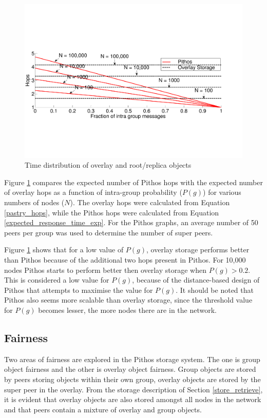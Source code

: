\documentclass[10pt,a4paper,conference]{IEEEtran}
\begin{document}
\begin{figure}[htbp]
 \centering
 \includegraphics[clip=true, viewport=0cm 5cm 27cm 14.5cm, width=\columnwidth]{Hops_vsGroupFrac_4n}
 \caption{Time distribution of overlay and root/replica objects}
 \label{fig_hop_compare}
\end{figure}
%
Figure \ref{fig_hop_compare} compares the expected number of Pithos hops with the expected number of overlay hops as a function of intra-group
probability ($P(g)$) for various numbers of nodes ($N$). The overlay hops were calculated from Equation \eqref{pastry_hops}, while the Pithos hops
were calculated from Equation \eqref{expected_response_time_exp}. For the Pithos graphs, an average number of 50 peers per group was used to
determine the number of super peers.

Figure \ref{fig_hop_compare} shows that for a low value of $P(g)$, overlay storage performs better than Pithos because of the additional two hops
present in Pithos. For 10,000 nodes Pithos starts to perform better then overlay storage when $P(g) > 0.2$. This is considered a low value for
$P(g)$, because of the distance-based design of Pithos that attempts to maximise the value for $P(g)$. It should be noted that Pithos also seems more
scalable than overlay storage, since the threshold value for $P(g)$ becomes lesser, the more nodes there are in the network.

\subsection{Fairness}

Two areas of fairness are explored in the Pithos storage system. The one is group object fairness and the other is overlay object fairness. Group
objects are stored by peers storing objects within their own group, overlay objects are stored by the super peer in the overlay. From the storage
description of Section \ref{store_retrieve}, it is evident that overlay objects are also stored amongst all nodes in the network and that peers
contain a mixture of overlay and group objects.
\end{document}
